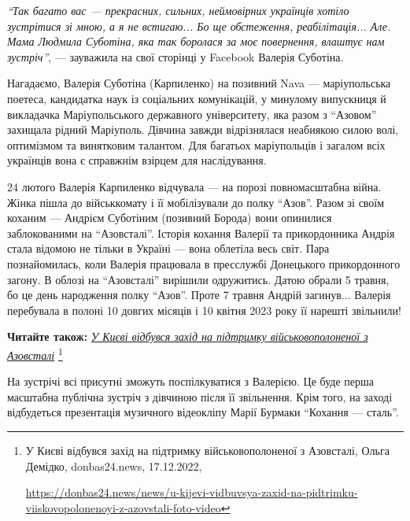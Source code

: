 \begin{leftbar}
\emph{\enquote{Так багато вас — прекрасних, сильних, неймовірних українців хотіло
зустрітися зі мною, а я не встигаю... Бо ще обстеження, реабілітація...
Але. Мама Людмила Суботіна, яка так боролася за моє повернення, влаштує
нам зустріч}}, — зауважила на свої сторінці у Facebook Валерія Суботіна.
\end{leftbar}

Нагадаємо, Валерія Суботіна (Карпиленко) на позивний Nava — маріупольська
поетеса, кандидатка наук із соціальних комунікацій, у минулому випускниця й
викладачка Маріупольського державного університету, яка разом з \enquote{Азовом}
захищала рідний Маріуполь. Дівчина завжди відрізнялася неабиякою силою волі,
оптимізмом та винятковим талантом. Для багатьох маріупольців і загалом всіх
українців вона є справжнім взірцем для наслідування.



24 лютого Валерія Карпиленко відчувала — на порозі повномасштабна війна. Жінка
пішла до військкомату і її мобілізували до полку \enquote{Азов}. Разом зі своїм коханим
— Андрієм Суботіним (позивний Борода) вони опинилися заблокованими на
\enquote{Азовсталі}. Історія кохання Валерії та прикордонника Андрія стала відомою не
тільки в Україні — вона облетіла весь світ. Пара познайомилась, коли Валерія
працювала в пресслужбі Донецького прикордонного загону. В облозі на \enquote{Азовсталі}
вирішили одружитись. Датою обрали 5 травня, бо це день народження полку \enquote{Азов}.
Проте 7 травня Андрій загинув... Валерія перебувала в полоні 10 довгих місяців і
10 квітня 2023 року її нарешті звільнили!

\textbf{Читайте також:} \href{https://donbas24.news/news/u-kijevi-vidbuvsya-zaxid-na-pidtrimku-viiskovopolonenoyi-z-azovstali-foto-video}{\emph{У Києві відбувся захід на підтримку військовополоненої з Азовсталі}}%
\footnote{У Києві відбувся захід на підтримку військовополоненої з Азовсталі, Ольга Демідко, donbas24.news, 17.12.2022, \par%
\url{https://donbas24.news/news/u-kijevi-vidbuvsya-zaxid-na-pidtrimku-viiskovopolonenoyi-z-azovstali-foto-video}%
}


На зустрічі всі присутні зможуть поспілкуватися з Валерією. Це буде перша
масштабна публічна зустріч з дівчиною після її звільнення. Крім того, на заході
відбудеться презентація музичного відеокліпу Марії Бурмаки \enquote{Кохання — сталь}.

